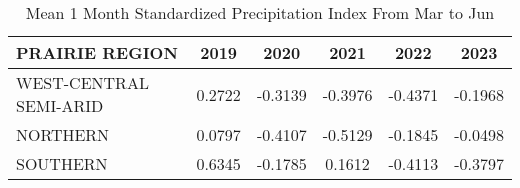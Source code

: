 \documentclass{article}
\begin{document}
\begin{table}[h!]
  \centering
  \caption{Mean 1 Month Standardized Precipitation Index From Mar to Jun }  %
  \begin{tabular}{lccccc}
    \toprule
    PRAIRIE REGION & 2019 & 2020 & 2021 & 2022 & 2023 \\
    \midrule
    WEST-CENTRAL SEMI-ARID & 0.2722 & -0.3139 & -0.3976 &-0.4371 & -0.1968 \\
    NORTHERN  & 0.0797 & -0.4107 &-0.5129 & -0.1845 & -0.0498\\
    SOUTHERN  &0.6345 & -0.1785 & 0.1612 & -0.4113 & -0.3797\\

    \bottomrule
  \end{tabular}
  \label{tab:example}
\end{table}
\end{document}
